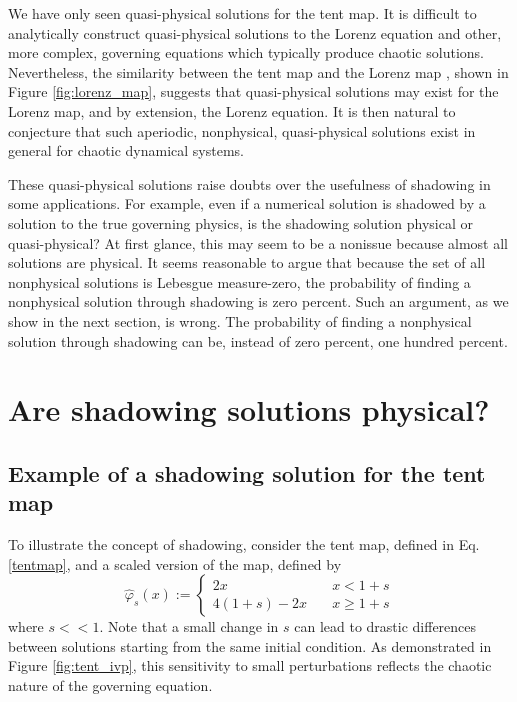 We have only seen quasi-physical solutions for the tent map.
It is difficult to analytically construct quasi-physical solutions
to the Lorenz equation and other, more complex, governing
equations which typically produce chaotic solutions.  Nevertheless, the similarity 
between the tent map and the Lorenz map \cite{tent2}, shown in Figure \ref{fig:lorenz_map}, suggests that
quasi-physical solutions may exist for the Lorenz map, and by
extension, the Lorenz equation.  It is then natural to conjecture
that such aperiodic, nonphysical, quasi-physical solutions
exist in general for chaotic dynamical systems.

These quasi-physical solutions raise doubts over the usefulness of shadowing
in some applications.  For example, even if a numerical
solution is shadowed by a solution to the true governing physics,
is the shadowing solution physical or quasi-physical? At first glance, this may 
seem to be a nonissue because almost all solutions are physical. 
It seems reasonable to argue that because the set of
all nonphysical solutions is Lebesgue measure-zero, the probability of finding
a nonphysical solution through shadowing is zero percent.  Such an argument,
as we show in the next section, is wrong.  The probability of
finding a nonphysical solution through shadowing can be, instead of
zero percent, one hundred percent.

\section{Are shadowing solutions physical?}
\label{sec:shadowingnonphysical}
\subsection{Example of a shadowing solution for the tent map}
\label{sec:sub:shadow-example}
To illustrate the concept of shadowing, consider the tent map, defined
in Eq. \ref{tentmap}, and a scaled version of the map, defined by
\begin{equation} \label{tent_scaled}
    \hat\varphi_s(x) := \begin{cases}
    2x \quad & x < 1+s \\
    4(1+s) - 2x \quad & x \ge 1+s
    \end{cases}
\end{equation}
where $s<<1$.  Note that a small change in $s$ can lead to drastic differences 
between solutions starting from the same initial condition.
As demonstrated in Figure \ref{fig:tent_ivp}, this sensitivity to small
perturbations reflects the chaotic nature of the governing equation.

